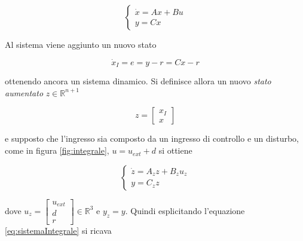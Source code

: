 		\begin{equation}
			\begin{cases}
				\dot{x}=Ax+Bu \\
				y=Cx
			\end{cases}
			\label{eq:sistemaNoD}
		\end{equation}
	
		\noindent Al sistema viene aggiunto un nuovo stato
		
		\begin{equation}
			\dot{x}_I=e=y-r=Cx-r
			\label{eq:NuovoStato}
		\end{equation}
	
		\noindent ottenendo ancora un sistema dinamico. Si definisce allora un nuovo \textit{stato aumentato} $z \in \mathbb{R}^{n+1}$
		
		\begin{equation}
			z=
			\begin{bmatrix}
				x_I \\
				x
			\end{bmatrix}
			\label{eq:statoAumentato}
		\end{equation}
	
		\noindent e supposto che l'ingresso sia composto da un ingresso di controllo e un disturbo, come in figura \ref{fig:integrale}, $u=u_{ext}+d$ si ottiene
		
		\begin{equation}
			\begin{cases}
				\dot{z}=A_zz+B_zu_z \\
				y=C_zz
			\end{cases}
			\label{eq:sistemaIntegrale}
		\end{equation}
		
		\noindent dove $u_z = \begin{bmatrix} u_{ext} \\ d \\ r \end{bmatrix} \in \mathbb{R}^3$ e $y_z=y$. Quindi esplicitando l'equazione \ref{eq:sistemaIntegrale} si ricava
		
